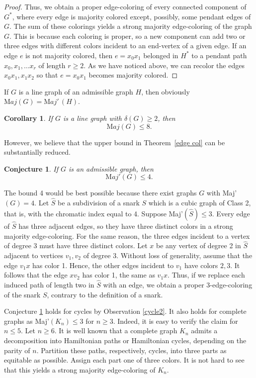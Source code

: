 \documentclass[11pt]{article}
\newtheorem{conjecture}[theorem]{Conjecture}
\newtheorem{corollary}[theorem]{Corollary}
\begin{document}
\begin{proof}
Thus, we obtain a proper edge-coloring of every connected component of $G^*$, where every edge is majority colored except, possibly, some pendant edges of $G$. The sum of these colorings yields a strong majority edge-coloring of the graph $G$. This is because each coloring is proper, so a new component can add two or three edges with different colors incident to an end-vertex of a given edge. If an edge $e$ is not majority colored, then $e=x_0x_1$ belonged in $H^*$ to a pendant path $x_0,x_1,\ldots x_r$ of length $r\ge 2$. As we have noticed above, we can recolor the edges $x_0x_1, x_1x_2$ so that $e=x_0x_1$ becomes majority colored.
\end{proof}

If $G$ is a line graph of an admissible graph $H$, then obviously ${\mathrm Maj}(G)={\mathrm Maj'\,}(H)$. 

\begin{corollary}
If $G$ is a line graph with $\delta(G)\ge 2$, then $${\mathrm Maj}(G)\le 8.$$ 
\end{corollary}


However, we believe that the upper bound in Theorem~\ref{edge col} can be substantially reduced.
\begin{conjecture}\label{Maj'4}
If $G$ is an admissible graph, then 
$${\mathrm Maj'}(G)\le 4.$$ 
\end{conjecture}

The bound 4 would be best possible because there exist graphs $G$ with Maj'$(G)=4$. Let $\widehat{S}$ be a subdivision of a snark $S$ which is a cubic graph of Class 2, that is, with the chromatic index equal to 4. Suppose Maj'$(\widehat{S})\le 3$. Every edge of $\widehat{S}$ has three adjacent edges, so they have three distinct colors in a strong majority edge-coloring. For the same reason, the three edges incident to a vertex of degree 3 must have three distinct colors. Let $x$ be any vertex of degree 2 in $\widehat{S}$ adjacent to vertices $v_1,v_2$ of degree 3. Without loss of generality, assume that the edge $v_1x$ has color 1. Hence, the other edges incident to $v_1$ have colors $2,3$. It follows that the edge $xv_2$ has color 1, the same as $v_1x$. Thus, if  we replace each induced path of length two in $\widehat{S}$ with an edge, we obtain a proper 3-edge-coloring of the snark $S$, contrary to the definition of a snark.

Conjecture \ref{Maj'4} holds for cycles by Observation \ref{cycle2}.  It also holds for complete graphs as Maj'$(K_n)\le 3$ for $n\ge 3$. Indeed, it is easy to verify the claim for $n\le5$. Let $n\ge 6$. It is well known that a complete graph $K_n$ admits a decomposition into Hamiltonian paths or Hamiltonian cycles, depending on the parity of $n$. Partition these paths, respectively, cycles, into three parts as equitable as possible. Assign each part one of three colors. It is not hard to see that this yields a strong majority edge-coloring of $K_n$. 
\end{document}
